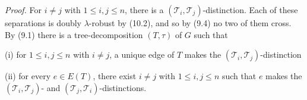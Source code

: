 \textit{Proof.} For $i \ne j$ with $1 \le i, j \le n$, there is a $(\mathscr{T}_i, \mathscr{T}_j)$-distinction. Each of these separations is doubly $\lambda$-robust by (10.2), and so by (9.4) no two of them cross. By (9.1) there is a tree-decomposition $(T, \tau)$ of $G$ such that

\hspace*{12pt}(i) for $1 \le i, j \le n$ with $i \ne j$, a unique edge of $T$ makes the $(\mathscr{T}_i, \mathscr{T}_j)$-distinction

\hspace*{12pt}(ii) for every $e \in E(T)$, there exist $i \ne j$ with $1 \le i, j \le n$ such that $e$ makes the $(\mathscr{T}_i, \mathscr{T}_j)$- and $(\mathscr{T}_j, \mathscr{T}_i)$-distinctions.
